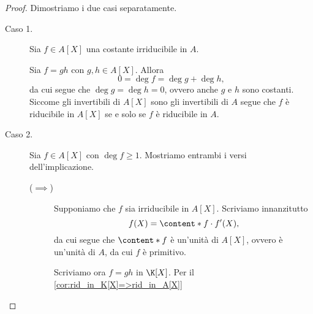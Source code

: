 \begin{proof}
    Dimostriamo i due casi separatamente.
    \begin{description}
        \item[Caso 1.] Sia $f \in A[X]$ una costante irriducibile in $A$. 
        
        Sia $f = gh$ con $g, h \in A[X]$. Allora \[
            0 = \deg f = \deg g + \deg h,    
        \] da cui segue che $\deg g = \deg h = 0$, ovvero anche $g$ e $h$ sono costanti. Siccome gli invertibili di $A[X]$ sono gli invertibili di $A$ segue che $f$ è riducibile in $A[X]$ se e solo se $f$ è riducibile in $A$.
        \item[Caso 2.] Sia $f \in A[X]$ con $\deg f $. Mostriamo entrambi i versi dell'implicazione.
        \begin{description}
            \item[($\implies$)] Supponiamo che $f$ sia irriducibile in $A[X]$. Scriviamo innanzitutto \[
                f(X) = \content*{f}\cdot f'(X),    
            \] da cui segue che $$ è un'unità di $A[X]$, ovvero è un'unità di $A$, da cui $f$ è primitivo.

            Scriviamo ora $f = gh$ in $\K[X]$. Per il \autoref{cor:rid_in_K[X]=>rid_in_A[X]}
        \end{description} 
    \end{description}
\end{proof}
